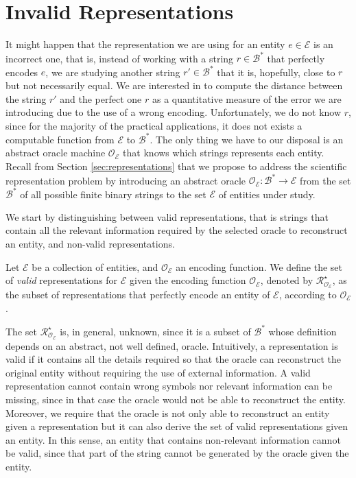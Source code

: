 %
%
\section{Invalid Representations}
\label{sec:invalid_representations}

It might happen that the representation we are using for an entity $e \in \mathcal{E}$ is an incorrect one, that is, instead of working with a string $r \in \mathcal{B}^\ast$ that perfectly encodes $e$, we are studying another string $r' \in \mathcal{B}^\ast$ that it is, hopefully, close to $r$ but not necessarily equal. We are interested in to compute the distance between the string $r'$ and the perfect one $r$ as a quantitative measure of the error we are introducing due to the use of a wrong encoding. Unfortunately, we do not know $r$, since for the majority of the practical applications, it does not exists a computable function from $\mathcal{E}$ to $\mathcal{B}^\ast$. The only thing we have to our disposal is an abstract oracle machine $\mathcal{O}_\mathcal{E}$ that knows which strings represents each entity. Recall from Section \ref{sec:representations} that we propose to address the scientific representation problem by introducing an abstract oracle $\mathcal{O}_\mathcal{E}:\mathcal{B}^\ast \rightarrow \mathcal{E}$ from the set $\mathcal{B}^\ast$ of all possible finite binary strings to the set $\mathcal{E}$ of entities under study.

We start by distinguishing between valid representations, that is strings that contain all the relevant information required by the selected oracle to reconstruct an entity, and non-valid representations.

\begin{definition}
Let $\mathcal{E}$ be a collection of entities, and $\mathcal{O}_\mathcal{E}$ an encoding function. We define the set of \emph{valid} representations for $\mathcal{E}$ given the encoding function $\mathcal{O}_\mathcal{E}$, denoted by $\mathcal{R}^\star_{\mathcal{O}_\mathcal{E}}$, as the subset of representations that perfectly encode an entity of $\mathcal{E}$, according to $\mathcal{O}_\mathcal{E}$.
\end{definition}

The set $\mathcal{R}^\star_{\mathcal{O}_\mathcal{E}}$ is, in general, unknown, since it is a subset of $\mathcal{B}^\ast$ whose definition depends on an abstract, not well defined, oracle. Intuitively, a representation is valid if it contains all the details required so that the oracle can reconstruct the original entity without requiring the use of external information. A valid representation cannot contain wrong symbols nor relevant information can be missing, since in that case the oracle would not be able to reconstruct the entity. Moreover, we require that the oracle is not only able to reconstruct an entity given a representation but it can also derive the set of valid representations given an entity. In this sense, an entity that contains non-relevant information cannot be valid, since that part of the string cannot be generated by the oracle given the entity.

